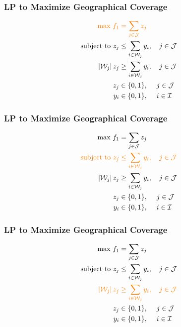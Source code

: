 \documentclass[10pt, compress]{beamer}
\begin{document}
\begin{frame}[fragile]
\frametitle{LP to Maximize Geographical Coverage}
\noindent{}
\begin{align*}\color{orange}
\textrm{max } f_1 &\color{orange}= \sum_{j \in \mathcal{J}} z_j \\
\textrm{subject to } z_j &\leq \sum_{i \in \mathcal{W}_j} y_i, \quad j \in \mathcal{J}\\
\left|\mathcal{W}_j\right|z_j &\geq \sum_{i \in \mathcal{W}_j} y_i, \quad j \in \mathcal{J} \\
z_j &\in \{0,1\}, \quad \; j \in \mathcal{J} \\
y_i &\in \{0,1\}, \quad \; i \in \mathcal{I}
\end{align*}
\end{frame}

\begin{frame}[fragile]
\frametitle{LP to Maximize Geographical Coverage}
\noindent{}
\begin{align*}
\textrm{max } f_1 &= \sum_{j \in \mathcal{J}} z_j \\
\color{orange}\textrm{subject to } z_j &\color{orange} \leq \sum_{i \in \mathcal{W}_j} y_i, \quad j \in \mathcal{J}\\
\left|\mathcal{W}_j\right|z_j &\geq \sum_{i \in \mathcal{W}_j} y_i, \quad j \in \mathcal{J} \\
z_j &\in \{0,1\}, \quad \; j \in \mathcal{J} \\
y_i &\in \{0,1\}, \quad \; i \in \mathcal{I}
\end{align*}
\end{frame}

\begin{frame}[fragile]
\frametitle{LP to Maximize Geographical Coverage}
\noindent{}
\begin{align*}
\textrm{max } f_1 &= \sum_{j \in \mathcal{J}} z_j \\
\textrm{subject to } z_j &\leq \sum_{i \in \mathcal{W}_j} y_i, \quad j \in \mathcal{J}\\
\color{orange} \left|\mathcal{W}_j\right|z_j & \color{orange} \geq \sum_{i \in \mathcal{W}_j} y_i, \quad j \in \mathcal{J} \\
z_j &\in \{0,1\}, \quad \; j \in \mathcal{J} \\
y_i &\in \{0,1\}, \quad \; i \in \mathcal{I}
\end{align*}
\end{frame}
\end{document}
